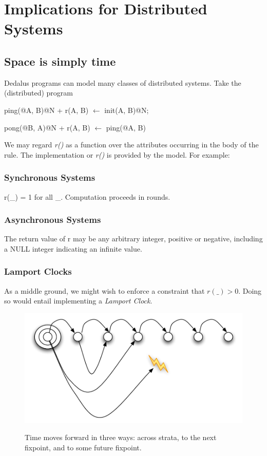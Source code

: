 \section{Implications for Distributed Systems}

\subsection{Space is simply time}

Dedalus programs can model many classes of distributed systems.  Take the (distributed) program

\begin{Dedalus}
ping(@A, B)@N + r(A, B) \(\leftarrow\)
  init(A, B)@N; 

pong(@B, A)@N + r(A, B) \(\leftarrow\)
  ping(@A, B)
\end{Dedalus}

We may regard  \emph{r()} as a function over the attributes occurring in the body of the rule.  The implementation or \emph{r()} is provided by
the model.  For example:

\subsubsection{Synchronous Systems}

r(\_) = 1 for all \_.  Computation proceeds in rounds.

\subsubsection{Asynchronous Systems}

The return value of r may be any arbitrary integer, positive or negative, including a NULL integer indicating an infinite value.

\subsubsection{Lamport Clocks}

As a middle ground, we might wish to enforce a constraint that $r(\_) > 0$.  Doing so would entail implementing a \emph{Lamport Clock}.

\begin{figure}[t]
  \centering
  \includegraphics[width=0.75\linewidth]{dedalus-time.pdf}
  \label{fig:dedalus-time}
  \caption{Time moves forward in three ways: across strata, to the next fixpoint, and to some future fixpoint.}
\vspace{-8pt}
\end{figure}



